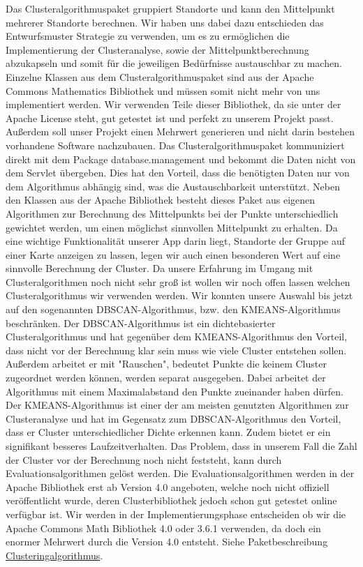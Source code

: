 Das Clusteralgorithmuspaket gruppiert Standorte und kann den Mittelpunkt mehrerer Standorte berechnen. Wir haben uns dabei dazu entschieden das Entwurfsmuster Strategie zu verwenden, um es zu ermöglichen die Implementierung der Clusteranalyse, sowie der Mittelpunktberechnung abzukapseln und somit für die jeweiligen Bedürfnisse austauschbar zu machen. Einzelne Klassen aus dem Clusteralgorithmuspaket sind aus der Apache Commons Mathematics Bibliothek und müssen somit nicht mehr von uns implementiert werden. Wir verwenden Teile dieser Bibliothek, da sie unter der Apache License steht, gut getestet ist und perfekt zu unserem Projekt passt. Außerdem soll unser Projekt einen Mehrwert generieren und nicht darin bestehen vorhandene Software nachzubauen. Das Clusteralgorithmuspaket kommuniziert direkt mit dem Package database.management und bekommt die Daten nicht von dem Servlet übergeben. Dies hat den Vorteil, dass die benötigten Daten nur von dem Algorithmus abhängig sind, was die Austauschbarkeit unterstützt. Neben den Klassen aus der Apache Bibliothek besteht dieses Paket aus eigenen Algorithmen zur Berechnung des Mittelpunkts bei der Punkte unterschiedlich gewichtet werden, um einen möglichst sinnvollen Mittelpunkt zu erhalten. Da eine wichtige Funktionalität unserer App darin liegt, Standorte der Gruppe auf einer Karte anzeigen zu lassen, legen wir auch einen besonderen Wert auf eine sinnvolle Berechnung der Cluster. Da unsere Erfahrung im Umgang mit Clusteralgorithmen noch nicht sehr groß ist wollen wir noch offen lassen welchen Clusteralgorithmus wir verwenden werden. Wir konnten unsere Auswahl bis jetzt auf den sogenannten DBSCAN-Algorithmus, bzw. den KMEANS-Algorithmus beschränken. Der DBSCAN-Algorithmus ist ein dichtebasierter Clusteralgorithmus und hat gegenüber dem KMEANS-Algorithmus den Vorteil, dass nicht vor der Berechnung klar sein muss wie viele Cluster entstehen sollen. Außerdem arbeitet er mit "Rauschen", bedeutet Punkte die keinem Cluster zugeordnet werden können, werden separat ausgegeben. Dabei arbeitet der Algorithmus mit einem Maximalabstand den Punkte zueinander haben dürfen. 
Der KMEANS-Algorithmus ist einer der am meisten genutzten Algorithmen zur Clusteranalyse und hat im Gegensatz zum DBSCAN-Algorithmus den Vorteil, dass er Cluster unterschiedlicher Dichte erkennen kann. Zudem bietet er ein signifikant besseres Laufzeitverhalten. Das Problem, dass in unserem Fall die Zahl der Cluster vor der Berechnung noch nicht feststeht, kann durch Evaluationsalgorithmen gelöst werden. Die Evaluationsalgorithmen werden in der Apache Bibliothek erst ab Version 4.0 angeboten, welche noch nicht offiziell veröffentlicht wurde, deren Clusterbibliothek jedoch schon gut getestet online verfügbar ist.
Wir werden in der Implementierungsphase entscheiden ob wir die Apache Commons Math Bibliothek 4.0 oder 3.6.1 verwenden, da doch ein enormer Mehrwert durch die Version 4.0 entsteht.
\newline
Siehe Paketbeschreibung \hyperlink{algorithm}{Clusteringalgorithmus}.
  \newline
 
